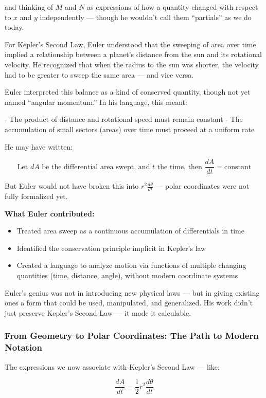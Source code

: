 and thinking of \( M \) and \( N \) as expressions of how a quantity changed with respect to \( x \) and \( y \) independently — though he wouldn’t call them “partials” as we do today.

For Kepler’s Second Law, Euler understood that the sweeping of area over time implied a relationship between a planet’s distance from the sun and its rotational velocity. He recognized that when the radius to the sun was shorter, the velocity had to be greater to sweep the same area — and vice versa.

Euler interpreted this balance as a kind of conserved quantity, though not yet named “angular momentum.” In his language, this meant:

- The product of distance and rotational speed must remain constant
- The accumulation of small sectors (areas) over time must proceed at a uniform rate

He may have written:

\[
\text{Let } dA \text{ be the differential area swept, and } t \text{ the time, then } \frac{dA}{dt} = \text{constant}
\]

But Euler would not have broken this into \( r^2 \frac{d\theta}{dt} \) — polar coordinates were not fully formalized yet.

\textbf{What Euler contributed:}
\begin{itemize}
    \item Treated area sweep as a continuous accumulation of differentials in time
    \item Identified the conservation principle implicit in Kepler’s law
    \item Created a language to analyze motion via functions of multiple changing quantities (time, distance, angle), without modern coordinate systems
\end{itemize}

Euler's genius was not in introducing new physical laws — but in giving existing ones a form that could be used, manipulated, and generalized. His work didn’t just preserve Kepler’s Second Law — it made it calculable.

\subsubsection{From Geometry to Polar Coordinates: The Path to Modern Notation}

The expressions we now associate with Kepler’s Second Law — like:

\[
\frac{dA}{dt} = \frac{1}{2} r^2 \frac{d\theta}{dt}
\]

